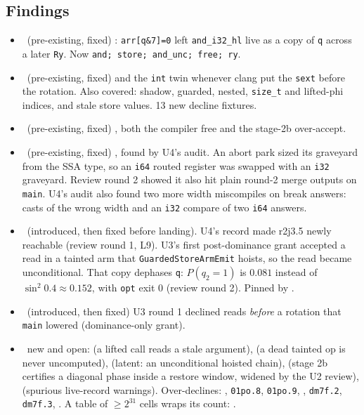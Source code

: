 \subsection*{Findings}
\begin{itemize}
  \item \fconfirmed\ (pre-existing, fixed) :
  \texttt{arr[q\&7]=0} left \texttt{and\_i32\_hl} live as a copy of
  \texttt{q} across a later \texttt{Ry}. Now
  \texttt{and; store; and\_unc; free; ry}.
  \item \fconfirmed\ (pre-existing, fixed) 
  and the \texttt{int} twin whenever clang put the \texttt{sext} before the
  rotation. Also covered: shadow, guarded, nested, \texttt{size\_t} and
  lifted-phi indices, and stale store values. 13 new decline fixtures.
  \item \fconfirmed\ (pre-existing, fixed) ,
  both the compiler free and the stage-2b over-accept.
  \item \fconfirmed\ (pre-existing, fixed) ,
  found by U4's audit. An abort park sized its graveyard from the SSA type, so
  an \texttt{i64} routed register was swapped with an \texttt{i32} graveyard.
  Review round 2 showed it also hit plain round-2 merge outputs on
  \texttt{main}. U4's audit also found two more width miscompiles on break
  answers: casts of the wrong width and an \texttt{i32} compare of two
  \texttt{i64} answers.
  \item \fconfirmed\ (introduced, then fixed before landing). U4's record made
  r2j3.5 newly reachable (review round 1, L9). U3's first post-dominance
  grant accepted a read in a tainted arm that \texttt{GuardedStoreArmEmit}
  hoists, so the read became unconditional. That copy dephases \texttt{q}:
  $P(q_2{=}1)$ is $0.081$ instead of $\sin^2 0.4\approx0.152$, with
  \texttt{opt} exit 0 (review round 2). Pinned by
  .
  \item \foverdecline\ (introduced, then fixed) U3 round 1 declined reads
  \emph{before} a rotation that \texttt{main} lowered (dominance-only grant).
  \item \fpreexisting\ new and open:  (a lifted
  call reads a stale argument),  (a dead tainted
  op is never uncomputed),  (latent: an
  unconditional hoisted chain),  (stage 2b
  certifies a diagonal phase inside a restore window, widened by the U2
  review),  (spurious live-record warnings).
  Over-declines: , \texttt{01po.8},
  \texttt{01po.9}, , \texttt{dm7f.2},
  \texttt{dm7f.3}, . A table of
  $\ge2^{31}$ cells wraps its count: .
\end{itemize}

